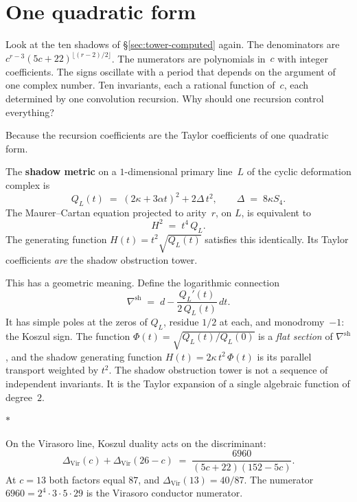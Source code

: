 \documentclass[11pt]{article}
\newcommand{\sep}{\bigskip\begin{center}$*$\end{center}\medskip}
\begin{document}
\section{One quadratic form}
\label{sec:one-quadratic-form}

Look at the ten shadows of \S\ref{sec:tower-computed} again.
The denominators are $c^{r-3}(5c+22)^{\lfloor(r-2)/2\rfloor}$.
The numerators are polynomials in~$c$ with integer coefficients.
The signs oscillate with a period that depends on the argument
of one complex number.  Ten invariants, each a rational function
of~$c$, each determined by one convolution recursion.  Why
should one recursion control everything?

Because the recursion coefficients are the Taylor coefficients
of one quadratic form.

\medskip

The \textbf{shadow metric} on a $1$-dimensional primary
line~$L$ of the cyclic deformation complex is
\begin{equation}\label{eq:shadow-metric-wn}
Q_L(t) \;=\; (2\kappa + 3\alpha t)^2 + 2\Delta\, t^2,
\qquad \Delta \;=\; 8\kappa S_4.
\end{equation}
The Maurer--Cartan equation projected to arity~$r$, on $L$,
is equivalent to
\begin{equation}\label{eq:riccati}
H^2 \;=\; t^4\, Q_L.
\end{equation}
The generating function $H(t) = t^2\sqrt{Q_L(t)}$ satisfies
this identically.  Its Taylor coefficients \textit{are} the
shadow obstruction tower.

This has a geometric meaning.  Define the logarithmic
connection
\begin{equation}\label{eq:shadow-nabla-wn}
\nabla^{\mathrm{sh}} \;=\;
d - \frac{Q_L'(t)}{2\,Q_L(t)}\,dt.
\end{equation}
It has simple poles at the zeros of $Q_L$, residue $1/2$ at
each, and monodromy~$-1$: the Koszul sign.  The function
$\Phi(t) = \sqrt{Q_L(t)/Q_L(0)}$ is a \textit{flat section}
of $\nabla^{\mathrm{sh}}$, and the shadow generating function
$H(t) = 2\kappa\,t^2\,\Phi(t)$ is its parallel transport
weighted by $t^2$.  The shadow obstruction tower is not a sequence of
independent invariants.  It is the Taylor expansion of a
single algebraic function of degree~$2$.

\sep

On the Virasoro line, Koszul duality acts on the discriminant:
\[
\Delta_{\mathrm{Vir}}(c) + \Delta_{\mathrm{Vir}}(26-c)
\;=\; \frac{6960}{(5c+22)(152-5c)}.
\]
At $c = 13$ both factors equal $87$, and
$\Delta_{\mathrm{Vir}}(13) = 40/87$.  The numerator
$6960 = 2^4 \cdot 3 \cdot 5 \cdot 29$ is the Virasoro
conductor numerator.
\end{document}
